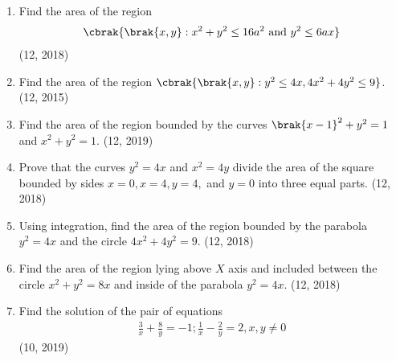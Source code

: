 \begin{enumerate}[label=\thesubsection.\arabic*,ref=\thesubsection.\theenumi]
%
\item Find the area of the region
  \begin{align*}
  \cbrak{\brak{x,y}:x^{2}+y^{2}\leq 16a^{2} ~\text{and}~ y^{2}\leq 6ax}
  \end{align*}
  \hfill (12, 2018)
\item Find the area of the region $\cbrak{\brak{x,y} : y^2 \leq 4x, 4x^2+4y^2 \leq 9}$.
\hfill (12, 2015)
\item Find the area of the region bounded by the curves $\brak{x-1}^{2} +y^{2} = 1$ and $ x^{2}+y^{2}  = 1$.
\hfill (12, 2019)
\item Prove that the curves $y^2 = 4x$ and $x^2 = 4y$ divide the area of the square bounded by sides $x=0,x=4,y=4,$ and $y=0$ into three equal parts.
\hfill (12, 2018)
\item Using integration, find the area of the region bounded by the parabola $y^{2}=4x$ and the circle $4x^{2}+4y^{2}=9$.
\hfill (12, 2018)
\item Find the area of the region lying above $X$ axis and included between the circle $x^2+y^2 = 8x$ and inside of the parabola $ y^2 = 4x$.
\hfill (12, 2018)
\item Find the solution of the pair of equations 
\begin{align*}
    \frac{3}{x}+\frac{8}{y}=-1; \frac{1}{x}-\frac{2}{y}=2, x, y\neq 0
\end{align*}
\hfill (10, 2019)

\end{enumerate}

